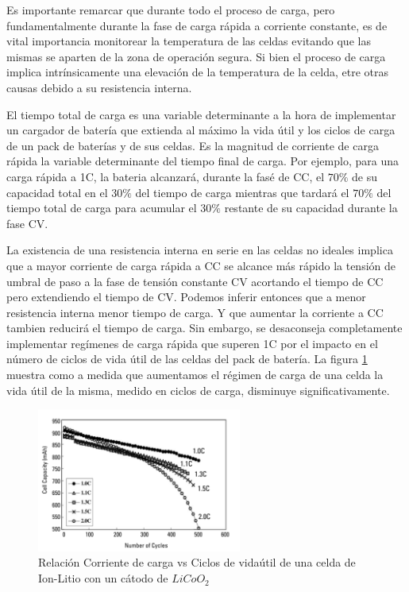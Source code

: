 \documentclass[10pt,a4paper]{article}
\begin{document}
Es importante remarcar que durante todo el proceso de carga, pero fundamentalmente
durante la fase de carga rápida a corriente constante, es de vital importancia monitorear la
temperatura de las celdas evitando que las mismas se aparten de la zona de
operación segura. Si bien el proceso de carga implica intrínsicamente una elevación de la
temperatura de la celda, etre otras causas debido a su resistencia interna.

El tiempo total de carga es una variable determinante a la hora de implementar
un cargador de batería que extienda al máximo la vida útil y los ciclos de carga
de un pack de baterías y de sus celdas. Es la magnitud de corriente de carga
rápida la variable determinante del tiempo final de carga. Por ejemplo, para una carga rápida a 1C, la bateria
alcanzará, durante la fasé de \acrshort{CC}, el $70\%$ de su capacidad total en el $30\%$ del tiempo de carga
mientras que tardará el $70\%$ del tiempo total de carga para acumular el $30\%$
restante de su capacidad durante la fase \acrshort{CV}. 

La existencia de una resistencia interna en serie en las celdas no ideales
implica que a mayor corriente de carga rápida a CC se alcance más
rápido la tensión de umbral de paso a la fase de tensión constante CV acortando
el tiempo de CC pero extendiendo el tiempo de CV. Podemos inferir entonces que a
menor resistencia interna menor tiempo de carga. Y que aumentar la corriente a
CC tambien reducirá el tiempo de carga. 
Sin embargo, se desaconseja completamente implementar regímenes de carga rápida
que superen 1C por el impacto en el número de ciclos de vida útil de las celdas
del pack de batería. La figura \ref{fig:C_vs_Cycle_I} muestra como a medida que
aumentamos el régimen de carga de una celda la
vida útil de la misma, medido en ciclos de carga, disminuye significativamente.

\begin{figure}[h!]
     \centering
     \includegraphics[width=0.6\textwidth]{bat_char/C_vs_Cycle_I.png}
     \caption{Relación Corriente de carga vs Ciclos de vidaútil de una
	celda de Ion-Litio con un cátodo de $LiCoO_2$}
     \label{fig:C_vs_Cycle_I}
\end{figure}
\FloatBarrier
\end{document}
